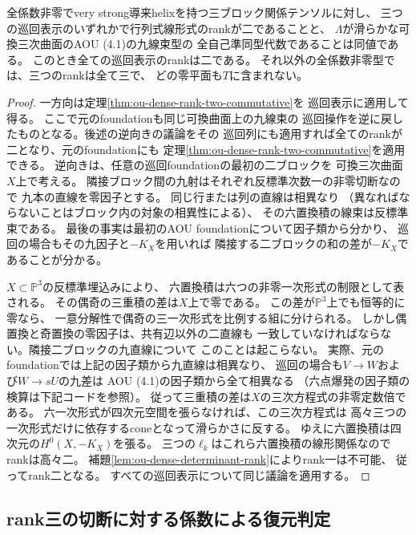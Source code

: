 \begin{corollary}[全係数非零の可換locusの判定]
\label{cor:ou-dense-commutative-rank-criterion}
全係数非零でvery strong導来helixを持つ三ブロック関係テンソルに対し、
三つの巡回表示のいずれかで行列式線形式のrankが二であることと、
$\Lambda$が滑らかな可換三次曲面のAOU (4.1)の九線束型の
全自己準同型代数であることは同値である。
このとき全ての巡回表示のrankは二である。
それ以外の全係数非零型では、三つのrankは全て三で、
どの零平面も$T$に含まれない。
\end{corollary}
\begin{proof}
一方向は定理\ref{thm:ou-dense-rank-two-commutative}を
巡回表示に適用して得る。
ここで元のfoundationも同じ可換曲面上の九線束の
巡回操作を逆に戻したものとなる。後述の逆向きの議論をその
巡回列にも適用すれば全てのrankが二となり、元のfoundationにも
定理\ref{thm:ou-dense-rank-two-commutative}を適用できる。
逆向きは、任意の巡回foundationの最初の二ブロックを
可換三次曲面$X$上で考える。
隣接ブロック間の九射はそれぞれ反標準次数一の非零切断なので
九本の直線を零因子とする。
同じ行または列の直線は相異なり
（異なればならないことはブロック内の対象の相異性による）、
その六置換積の線束は反標準束である。
最後の事実は最初のAOU foundationについて因子類から分かり、
巡回の場合もその九因子と$-K_X$を用いれば
隣接する二ブロックの和の差が$-K_X$であることが分かる。

$X\subset\mathbb P^3$の反標準埋込みにより、
六置換積は六つの非零一次形式の制限として表される。
その偶奇の三重積の差は$X$上で零である。
この差が$\mathbb P^3$上でも恒等的に零なら、
一意分解性で偶奇の三一次形式を比例する組に分けられる。
しかし偶置換と奇置換の零因子は、共有辺以外の二直線も
一致していなければならない。隣接二ブロックの九直線について
このことは起こらない。
実際、元のfoundationでは上記の因子類から九直線は相異なり、
巡回の場合も$V\to W$および$W\to sU$の九差は
AOU (4.1)の因子類から全て相異なる
（六点爆発の因子類の検算は下記コードを参照）。
従って三重積の差は$X$の三次方程式の非零定数倍である。
六一次形式が四次元空間を張らなければ、この三次方程式は
高々三つの一次形式だけに依存するconeとなって滑らかさに反する。
ゆえに六置換積は四次元の$H^0(X,-K_X)$を張る。
三つの$\ell_k$はこれら六置換積の線形関係なのでrankは高々二。
補題\ref{lem:ou-dense-determinant-rank}によりrank一は不可能、
従ってrank二となる。
すべての巡回表示について同じ議論を適用する。
\end{proof}

\subsection{rank三の切断に対する係数による復元判定}
\label{subsec:ou-dense-rank-three-tests}

